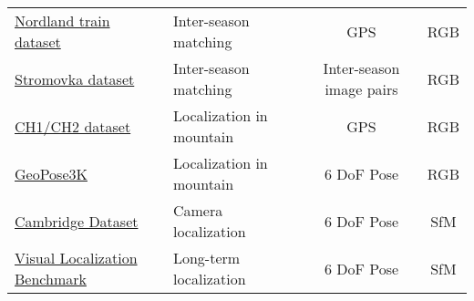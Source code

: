 \begin{landscape}
\begin{table}
{\begin{tabular}{l  l  c  c}
			\href{https://nrkbeta.no/2013/01/15/nordlandsbanen-minute-by-minute-season-by-season/}{Nordland train dataset} & Inter-season matching & GPS & RGB \\
			\href{http://labe.felk.cvut.cz/~tkrajnik/dataset/}{Stromovka dataset} \citep{Krajnik2010} & Inter-season matching & Inter-season image pairs & RGB \\[3pt]		

			\href{https://cvg.ethz.ch/research/mountain-localization/}{CH1/CH2 dataset} \citep{Saurer2016} & Localization in mountain & GPS & RGB \\
			\href{http://cphoto.fit.vutbr.cz/geoPose3K/}{GeoPose3K} \citep{Brejcha2017a} & Localization in mountain & 6 DoF Pose & RGB \\[3pt]
			\href{http://mi.eng.cam.ac.uk/projects/relocalisation/\#dataset}{Cambridge Dataset} \citep{Kendall2015} & Camera localization & 6 DoF Pose & SfM \\
			\href{https://www.visuallocalization.net/}{Visual Localization Benchmark} \citep{Sattler2018} & Long-term localization & 6 DoF Pose & SfM \\


\end{tabular}}
\end{table}
\end{landscape}
